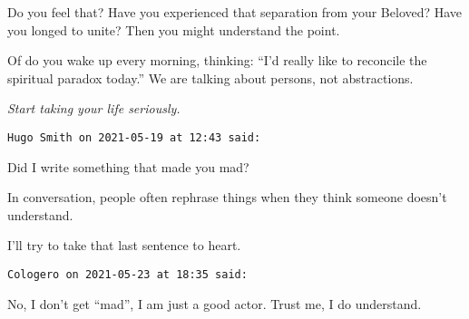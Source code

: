 \begin{footnotesize}
\begin{sffamily}
\begin{quotex}
\end{quotex}
Do you feel that? Have you experienced that separation from your Beloved? Have you longed to unite? Then you might understand the point.

Of do you wake up every morning, thinking: “I'd really like to reconcile the spiritual paradox today.” We are talking about persons, not abstractions.

\emph{Start taking your life seriously.}


\hfill

\texttt{Hugo Smith on 2021-05-19 at 12:43 said: }

Did I write something that made you mad?

In conversation, people often rephrase things when they think someone doesn't understand.

I'll try to take that last sentence to heart.


\hfill

\texttt{Cologero on 2021-05-23 at 18:35 said: }

No, I don't get “mad”, I am just a good actor. Trust me, I do understand.


\end{sffamily}\end{footnotesize}
